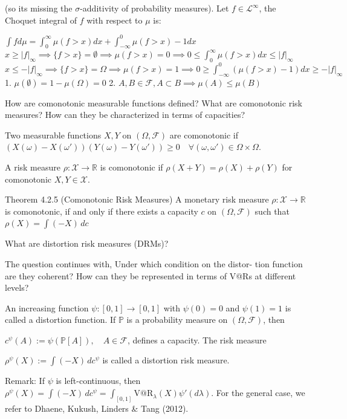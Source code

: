 {(so its missing the \( \sigma \)-additivity of probability measures).
Let \( f \in \mathcal{L}^\infty \),
the Choquet integral of \( f \) with respect to \( \mu \) is:

\( \int f d\mu = \int_{0}^\infty \mu(f > x)dx + \int_{-\infty}^0 \mu(f > x) - 1 dx \)
\(x \ge |f|_\infty \implies \{f > x\} = \emptyset \implies \mu(f > x) = 0 \implies 0 \le \int_0^\infty \mu(f > x) dx \le |f|_\infty\)
\(x \le -|f|_\infty \implies \{f > x\} = \Omega \implies \mu(f > x) = 1 \implies 0 \ge \int_{-\infty}^0 (\mu(f > x) - 1) dx \ge -|f|_\infty\)
1. \(\mu(\emptyset) = 1 - \mu(\Omega) = 0\)
2. \(A, B \in \mathcal{F}, A \subset B \implies \mu(A) \le \mu(B)\)

How are comonotonic measurable functions defined? What are comonotonic risk
measures? How can they be characterized in terms of capacities?

Two measurable functions \( X, Y \) on \((\Omega, \mathcal{F})\) are comonotonic if
\(
(X(\omega) - X(\omega'))(Y(\omega) - Y(\omega')) \geq 0 \quad \forall(\omega, \omega') \in \Omega \times \Omega.
\)

A risk measure \(\rho : \mathcal{X} \to \mathbb{R}\) is comonotonic if
\(
\rho(X + Y) = \rho(X) + \rho(Y)
\)
for comonotonic \(X, Y \in \mathcal{X}\).

Theorem 4.2.5 (Comonotonic Risk Measures)
A monetary risk measure \(\rho : \mathcal{X} \to \mathbb{R}\) is comonotonic, if and only if there exists a capacity \(c\) on \((\Omega, \mathcal{F})\) such that
\(
\rho(X) = \int (-X) \, dc
\)

What are distortion risk measures (DRMs)?

The question continues with,
Under which condition on the distor-
tion function are they coherent? How can they be represented in terms of V@Rs
at different levels?

An increasing function \(\psi : [0, 1] \rightarrow [0, 1]\) with \(\psi(0) = 0\) and \(\psi(1) = 1\) is called a distortion function. 
If \(\mathbb{P}\) is a probability measure on \((\Omega, \mathcal{F})\), then 

\(c^{\psi}(A) := \psi(\mathbb{P}[A]), \quad A \in \mathcal{F}\),
defines a capacity. The risk measure 

\(\rho^{\psi}(X) := \int (-X) \, dc^{\psi}\)
is called a distortion risk measure.

Remark:
If \(\psi\) is left-continuous, then \(\rho^{\psi}(X) = \int (-X) \, dc^{\psi} = \int_{[0,1]} \text{V@R}_{\lambda}(X) \psi'(d\lambda)\). 
For the general case, we refer to Dhaene, Kukush, Linders & Tang (2012).

}
